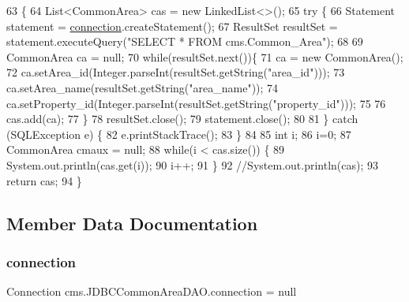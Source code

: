 \begin{DoxyCode}
63                                      \{
64         List<CommonArea> cas = \textcolor{keyword}{new} LinkedList<>();
65          \textcolor{keywordflow}{try} \{
66                 Statement statement = \mbox{\hyperlink{classcms_1_1_j_d_b_c_common_area_d_a_o_a9cd45620d4795fbf71bb1e4408e2100f}{connection}}.createStatement();
67                 ResultSet resultSet = statement.executeQuery(\textcolor{stringliteral}{"SELECT * FROM cms.Common\_Area"});
68                  
69                 CommonArea ca = null;
70                 \textcolor{keywordflow}{while}(resultSet.next())\{
71                     ca = \textcolor{keyword}{new} CommonArea();
72                     ca.setArea\_id(Integer.parseInt(resultSet.getString(\textcolor{stringliteral}{"area\_id"})));
73                     ca.setArea\_name(resultSet.getString(\textcolor{stringliteral}{"area\_name"}));
74                     ca.setProperty\_id(Integer.parseInt(resultSet.getString(\textcolor{stringliteral}{"property\_id"})));
75                      
76                     cas.add(ca);
77                 \}
78                 resultSet.close();
79                 statement.close();
80                  
81             \} \textcolor{keywordflow}{catch} (SQLException e) \{
82                 e.printStackTrace();
83             \}
84          
85             \textcolor{keywordtype}{int} i;
86             i=0;
87             CommonArea cmaux = null;
88             \textcolor{keywordflow}{while}(i < cas.size()) \{
89                     System.out.println(cas.get(i));
90                     i++;
91              \}
92             \textcolor{comment}{//System.out.println(cas);}
93             \textcolor{keywordflow}{return} cas;
94     \}
\end{DoxyCode}


\subsection{Member Data Documentation}
\mbox{\label{classcms_1_1_j_d_b_c_common_area_d_a_o_a9cd45620d4795fbf71bb1e4408e2100f}} 
\subsubsection{\texorpdfstring{connection}{connection}}
{\footnotesize\ttfamily Connection cms.\+J\+D\+B\+C\+Common\+Area\+D\+A\+O.\+connection = null\hspace{0.3cm}{\ttfamily [package]}}

